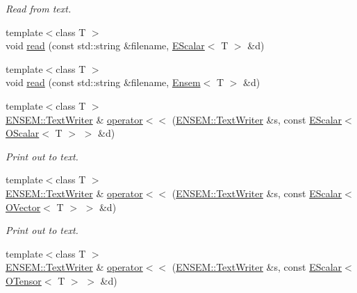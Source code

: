 \begin{DoxyCompactItemize}
\begin{DoxyCompactList}\small\item\em Read from text. \end{DoxyCompactList}\item 
{\footnotesize template$<$class T $>$ }\\void \mbox{\hyperlink{namespaceENSEM_a22fcd7a4711d3682c9d89b9f605f11b4}{read}} (const std\+::string \&filename, \mbox{\hyperlink{classENSEM_1_1EScalar}{E\+Scalar}}$<$ T $>$ \&d)
\item 
{\footnotesize template$<$class T $>$ }\\void \mbox{\hyperlink{namespaceENSEM_abba4aaa73ad3238ce36775177195cbdc}{read}} (const std\+::string \&filename, \mbox{\hyperlink{classENSEM_1_1Ensem}{Ensem}}$<$ T $>$ \&d)
\item 
{\footnotesize template$<$class T $>$ }\\\mbox{\hyperlink{classENSEM_1_1TextWriter}{E\+N\+S\+E\+M\+::\+Text\+Writer}} \& \mbox{\hyperlink{namespaceENSEM_afd853d981d87472175af5dac828d6bbb}{operator$<$$<$}} (\mbox{\hyperlink{classENSEM_1_1TextWriter}{E\+N\+S\+E\+M\+::\+Text\+Writer}} \&s, const \mbox{\hyperlink{classENSEM_1_1EScalar}{E\+Scalar}}$<$ \mbox{\hyperlink{classENSEM_1_1OScalar}{O\+Scalar}}$<$ T $>$ $>$ \&d)
\begin{DoxyCompactList}\small\item\em Print out to text. \end{DoxyCompactList}\item 
{\footnotesize template$<$class T $>$ }\\\mbox{\hyperlink{classENSEM_1_1TextWriter}{E\+N\+S\+E\+M\+::\+Text\+Writer}} \& \mbox{\hyperlink{namespaceENSEM_a7805eb4e273ee2d88e608b67e6a92d7c}{operator$<$$<$}} (\mbox{\hyperlink{classENSEM_1_1TextWriter}{E\+N\+S\+E\+M\+::\+Text\+Writer}} \&s, const \mbox{\hyperlink{classENSEM_1_1EScalar}{E\+Scalar}}$<$ \mbox{\hyperlink{classENSEM_1_1OVector}{O\+Vector}}$<$ T $>$ $>$ \&d)
\begin{DoxyCompactList}\small\item\em Print out to text. \end{DoxyCompactList}\item 
{\footnotesize template$<$class T $>$ }\\\mbox{\hyperlink{classENSEM_1_1TextWriter}{E\+N\+S\+E\+M\+::\+Text\+Writer}} \& \mbox{\hyperlink{namespaceENSEM_a7e41e43f669c8c025f5ea84f65990bc2}{operator$<$$<$}} (\mbox{\hyperlink{classENSEM_1_1TextWriter}{E\+N\+S\+E\+M\+::\+Text\+Writer}} \&s, const \mbox{\hyperlink{classENSEM_1_1EScalar}{E\+Scalar}}$<$ \mbox{\hyperlink{classENSEM_1_1OTensor}{O\+Tensor}}$<$ T $>$ $>$ \&d)

\end{DoxyCompactItemize}
